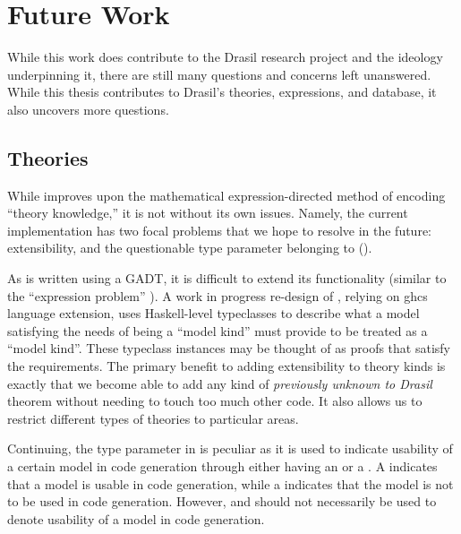 \chapter{Future Work}
\label{chap:future-work}

While this work does contribute to the Drasil research project and the ideology
underpinning it, there are still many questions and concerns left unanswered.
While this thesis contributes to Drasil's theories, expressions, and database,
it also uncovers more questions.

\section{Theories}
\label{chap:futureWork:sec:theories}

While  improves upon the mathematical expression-directed
method of encoding ``theory knowledge,'' it is not without its own issues.
Namely, the current implementation has two focal problems that we hope to
resolve in the future: extensibility, and the questionable type parameter
belonging to \ModelKind{} ().

As \ModelKinds{} is written using a GADT, it is difficult to extend its
functionality (similar to the ``expression problem''
\cite{Wadler1999ExpressionProblem}). A work in progress re-design of
\ModelKinds{} \cite{DrasilIssue2853AlternativeModelKinds}, relying on \acs{ghc}s
\ConstraintKinds{} \cite{GHC2020ConstraintKinds} language extension, uses
Haskell-level typeclasses to describe what a model satisfying the needs of being
a ``model kind'' must provide to be treated as a ``model kind''. These typeclass
instances may be thought of as proofs that satisfy the requirements. The primary
benefit to adding extensibility to theory kinds is exactly that we become able
to add any kind of \textit{previously unknown to Drasil} theorem without needing
to touch too much other code. It also allows us to restrict different types of
theories to particular areas.

Continuing, the type parameter in \ModelKinds{} is peculiar as it is used to
indicate usability of a certain model in code generation through either having
an \Expr{} or a \ModelExpr{}. A  indicates that a model
is usable in code generation, while a  indicates
that the model is not to be used in code generation. However, \Expr{} and
\ModelExpr{} should not necessarily be used to denote usability of a model in
code generation.

